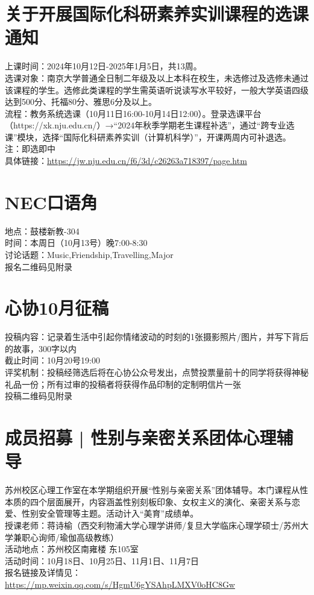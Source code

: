 \documentclass[letterpaper, 12pt]{article}
\begin{document}
\begin{multicols}{2}
\section{关于开展国际化科研素养实训课程的选课通知 }
上课时间：2024年10月12日-2025年1月5日，共13周。\\
选课对象：南京大学普通全日制二年级及以上本科在校生，未选修过及选修未通过该课程的学生。选修此类课程的学生需英语听说读写水平较好，一般大学英语四级达到500分、托福80分、雅思6分及以上。\\
流程：教务系统选课（10月11日16:00-10月14日12:00）。登录选课平台（https://xk.nju.edu.cn/）→“2024年秋季学期老生课程补选”，通过“跨专业选课”模块，选择“国际化科研素养实训（计算机科学）”，开课两周内可补退选。\\
注：即选即中\\
具体链接：\url{https://jw.nju.edu.cn/f6/3d/c26263a718397/page.htm}\\

\section{NEC口语角}
地点：鼓楼新教-304\\时间：本周日（10月13号）晚7:00-8:30\\讨论话题：Music,Friendship,Travelling,Major\\报名二维码见附录
\section{心协10月征稿}
投稿内容：记录着生活中引起你情绪波动的时刻的1张摄影照片/图片，并写下背后的故事，300字以内\\截止时间：10月20号19:00\\评奖机制：投稿经筛选后将在心协公众号发出，点赞投票量前十的同学将获得神秘礼品一份；所有过审的投稿者将获得作品印制的定制明信片一张\\投稿二维码见附录 
\section{成员招募 | 性别与亲密关系团体心理辅导}
苏州校区心理工作室在本学期组织开展“性别与亲密关系”团体辅导。本门课程从性本质的四个层面展开，内容涵盖性别刻板印象、女权主义的演化、亲密关系与恋爱、性别安全管理等主题。活动计入“美育”成绩单。\\
授课老师：蒋诗榆（西交利物浦大学心理学讲师/复旦大学临床心理学硕士/苏州大学兼职心询师/瑜伽高级教练）\\
活动地点：苏州校区南雍楼 东105室\\
活动时间：10月18日、10月25日、11月1日、11月7日\\
报名链接及详情见：\url{https://mp.weixin.qq.com/s/HgmU6gYSAhpLMXV0oHC8Gw}\\

\end{multicols}
\end{document}
